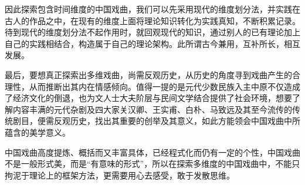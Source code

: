 因此探索包含时间维度的中国戏曲，我们可以先采用现代的维度划分法，并实践在古人的作品之中，在现有的维度上面将理论知识转化为实践真知，不断积累记录。待到现代的维度划分法不起作用时，就回观现代的知识，通过别人的已有理论加上自己的实践相结合，构造属于自己的理论架构。此所谓古今兼用，互补所长，相互发展。

最后，要想真正探索出多维戏曲，尚需反观历史，从历史的角度寻到戏曲产生的合理性，从而推断出其内在情感倾向。值得一提的是元代少数民族入主中原不仅造成了经济文化的倒退，也为文人士大夫阶层与民间文学结合提供了社会环境，想要了解内容丰满的元代杂剧及四大家关汉卿、王实甫、白朴、马致远及其至今流传的传统剧目，便需反观历史，找出其重要的创举及其意义，如此方能领会中国戏曲中所蕴含的美学意义。

中国戏曲高度提炼、概括而又丰富具体，已经程式化而仍有一定的个性，中国戏曲不是一般形式美，而是“有意味的形式”，所以在探索多维度的中国戏曲中，不能只拘泥于理论上的框架方法，更需要用心去感受，敢于发散思维。
